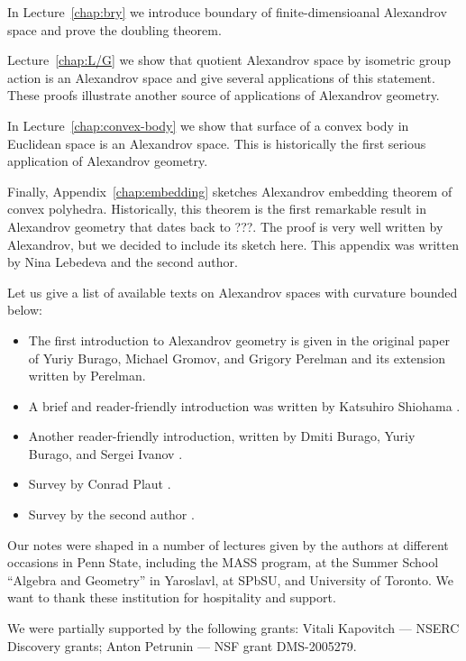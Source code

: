 In Lecture~\ref{chap:bry} we introduce boundary of finite-dimensioanal Alexandrov space and prove the doubling theorem.

Lecture~\ref{chap:L/G} we show that quotient Alexandrov space by isometric group action is an Alexandrov space and give several applications of this statement.
These proofs illustrate another source of applications of Alexandrov geometry.

In Lecture~\ref{chap:convex-body} we show that surface of a convex body in Euclidean space is an Alexandrov space. This is historically the first serious application of Alexandrov geometry.

Finally, Appendix~\ref{chap:embedding} sketches Alexandrov embedding theorem of convex polyhedra.
Historically, this theorem is the first remarkable result in Alexandrov geometry that dates back to ???.
The proof is very well written by Alexandrov, but we decided to include its sketch here.
This appendix was written by Nina Lebedeva and the second author.

Let us give a list of available texts on Alexandrov spaces with curvature bounded below: 
\begin{itemize}
\item The first introduction to Alexandrov geometry is given in the original paper of Yuriy Burago, Michael Gromov, and Grigory Perelman \cite{burago-gromov-perelman} 
and its extension \cite{perelman1991} written by Perelman.
\item A brief and reader-friendly introduction was written by Katsuhiro Shiohama \cite[Sections 1--8]{shiohama}.
\item Another reader-friendly introduction, written by Dmiti Burago, Yuriy
Burago, and Sergei Ivanov \cite[Chapter 10]{burago-burago-ivanov}.
\item Survey by Conrad Plaut \cite{plaut:survey}.
\item Survey by the second author \cite{petrunin:survey}.
\end{itemize}

Our notes were shaped in a number of lectures given by the authors
at different occasions in Penn State, including the MASS program,
at the Summer School ``Algebra and Geometry'' in Yaroslavl,
at SPbSU,
and University of Toronto.
We want to thank these institution for hospitality and support.

We were partially supported by the following grants:
Vitali Kapovitch ---   NSERC Discovery grants;
Anton Petrunin --- 
NSF grant DMS-2005279. %


